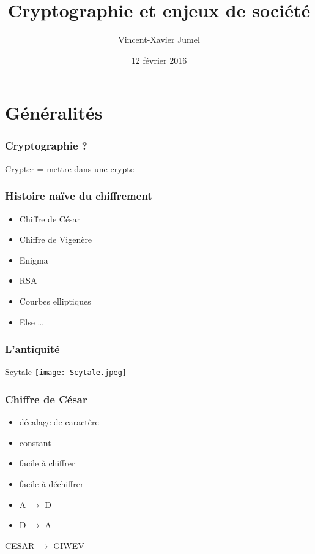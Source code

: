 \documentclass[french]{beamer}
\title{Cryptographie et enjeux de société}
\author[jumelvin@jbs-ndc93.com]{Vincent-Xavier Jumel}
\date{12 février 2016}
\institute{Jean-Baptiste de la Salle -- Saint-Denis}
\begin{document}
\section{Généralités}

\begin{frame}
  \maketitle
\end{frame}

\begin{frame}
  \frametitle{Cryptographie ?}
  Crypter = mettre dans une crypte
\end{frame}

\begin{frame}
  \frametitle{Histoire naïve du chiffrement}
  \begin{itemize}
    \item Chiffre de César
    \item Chiffre de Vigenère
    \item Enigma
    \item RSA
    \item Courbes elliptiques
    \item Else …
  \end{itemize}
\end{frame}

\begin{frame}
  \frametitle{L'antiquité}
  \begin{block}{Scytale}
    \texttt{[image: Scytale.jpeg]}
  \end{block}
\end{frame}

\begin{frame}
  \frametitle{Chiffre de César}
  \begin{multicols}{2}
    \begin{block}{}
      \begin{itemize}
        \item décalage de caractère
        \item constant
        \item facile à chiffrer
        \item facile à déchiffrer
      \end{itemize}
    \end{block}
    \begin{block}{}
      \begin{itemize}
        \item A $\rightarrow$ D
        \item D $\rightarrow$ A
      \end{itemize}
      CESAR $\rightarrow$ GIWEV
    \end{block}
  \end{multicols}
\end{frame}
\end{document}
